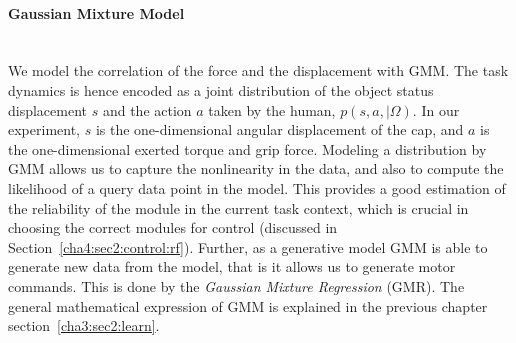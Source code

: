 
\paragraph{Gaussian Mixture Model} ~\\
We model the correlation of the force and the displacement with
GMM. The task dynamics is hence encoded as a joint distribution of the object status displacement $s$ and the action $a$ taken by the human, $p(s,a,{\mid}{\Omega})$. In our experiment, $s$ is the one-dimensional angular displacement of the cap, and $a$ is the one-dimensional exerted torque and grip force.
Modeling a distribution by GMM allows us to capture the nonlinearity in the data, and also to compute the likelihood of a query data point in the model. This provides a good estimation of the reliability of the module in the current task context, which is crucial in choosing the correct modules for control  (discussed in Section~\ref{cha4:sec2:control:rf}).
Further, as a generative model GMM is able to
generate new data from the model, that is it allows us to generate motor commands. This is done by the {\em Gaussian Mixture Regression} (GMR). The general mathematical expression of GMM is explained in the previous chapter section~\ref{cha3:sec2:learn}.

